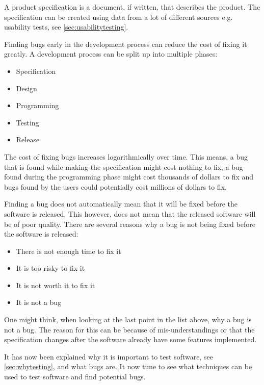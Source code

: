 A product specification is a document, if written, that describes the product.
The specification can be created using data from a lot of different sources e.g. usability tests, see \cref{sec:usabilitytesting}. \cite{SoftwareTesting}

Finding bugs early in the development process can reduce the cost of fixing it greatly.
A development process can be split up into multiple phases:

\begin{itemize}
	\item Specification
	\item Design
	\item Programming
	\item Testing
	\item Release
\end{itemize}

The cost of fixing bugs increases logarithmically over time.
This means, a bug that is found while making the specification might cost nothing to fix, a bug found during the programming phase might cost thousands of dollars to fix and bugs found by the users could potentially cost millions of dollars to fix. \cite{SoftwareTesting}


Finding a bug does not automatically mean that it will be fixed before the software is released.
This however, does not mean that the released software will be of poor quality.
There are several reasons why a bug is not being fixed before the software is released: \cite{SoftwareTesting}

\begin{itemize}
	\item There is not enough time to fix it
	\item It is too risky to fix it
	\item It is not worth it to fix it
	\item It is not a bug
\end{itemize}

One might think, when looking at the last point in the list above, why a bug is not a bug.
The reason for this can be because of mis-understandings or that the specification changes after the software already have some features implemented. \cite{SoftwareTesting}

It has now been explained why it is important to test software, see \cref{sec:whytesting}, and what bugs are.
It now time to see what techniques can be used to test software and find potential bugs.
